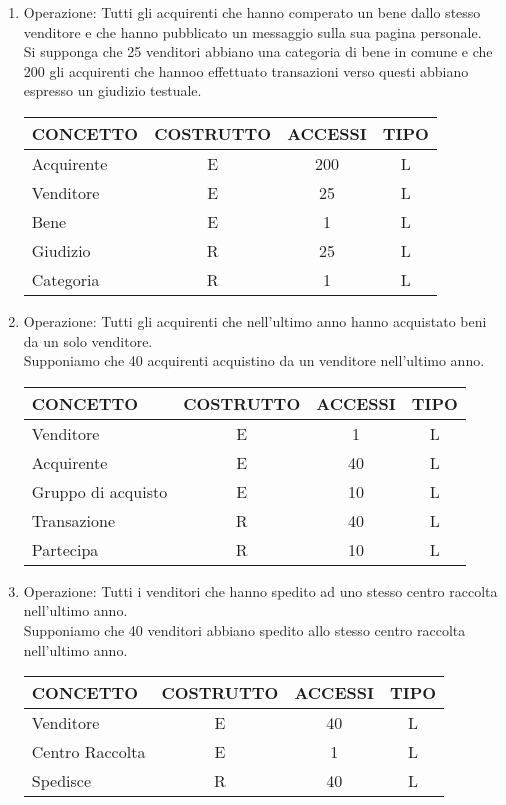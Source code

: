 \documentclass[a4paper, 10pt]{report}
\begin{document}
\begin{enumerate}
\item Operazione: Tutti gli acquirenti che hanno comperato un bene dallo stesso venditore e che hanno pubblicato un messaggio sulla sua pagina personale.\\
Si supponga che 25 venditori abbiano una categoria di bene in comune e che 200 gli acquirenti che hannoo effettuato transazioni verso questi abbiano espresso un giudizio testuale.
\begin{table}[h!]
\centering
\begin{tabular}{|l|c|c|c|}
\hline
\textbf{CONCETTO}&\textbf{COSTRUTTO}&\textbf{ACCESSI}&\textbf{TIPO}\\
\hline
Acquirente & E & 200 & L\\
\hline
Venditore & E & 25 & L\\
\hline
Bene & E & 1 & L\\
\hline
Giudizio & R & 25 & L\\
\hline
Categoria & R & 1 & L\\
\hline
\end{tabular}
\end{table}

\item Operazione: Tutti gli acquirenti che nell'ultimo anno hanno acquistato beni da un solo venditore.\\
Supponiamo che 40 acquirenti acquistino da un venditore nell'ultimo anno.
\begin{table}[h!]
\centering
\begin{tabular}{|l|c|c|c|}
\hline
\textbf{CONCETTO}&\textbf{COSTRUTTO}&\textbf{ACCESSI}&\textbf{TIPO}\\
\hline
Venditore & E & 1 & L\\ 
\hline
Acquirente & E & 40 & L\\
\hline
Gruppo di acquisto & E & 10 & L\\
\hline
Transazione & R & 40 & L\\
\hline
Partecipa & R & 10 & L\\
\hline
\end{tabular}
\end{table}
\newpage 
\item Operazione: Tutti i venditori che hanno spedito ad uno stesso centro 
      raccolta nell'ultimo anno.\\
      Supponiamo che 40 venditori abbiano spedito allo stesso centro raccolta
      nell'ultimo anno.
\begin{table}[h!]
\centering
\begin{tabular}{|l|c|c|c|}
\hline
\textbf{CONCETTO}&\textbf{COSTRUTTO}&\textbf{ACCESSI}&\textbf{TIPO}\\
\hline
Venditore & E & 40 & L\\
\hline
Centro Raccolta & E & 1 & L\\
\hline
Spedisce & R & 40 & L\\
\hline
\end{tabular}
\end{table}


\end{enumerate}
\end{document}
